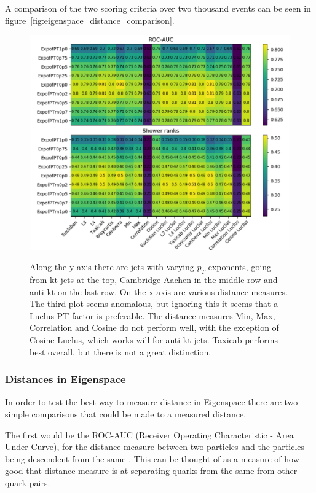 A comparison of the two scoring criteria over two thousand events can be seen in figure~\ref{fig:eigenspace_distance_comparison}.
\begin{figure}[htp]
    \includegraphics[width=1.\textwidth]{graphics/physspace_distance_comparison}
    \label{fig:physspace_distance_comparison}
    \caption{
            Along the y axis there are jets with varying \(p_T\) exponents, going
            from kt jets at the top, Cambridge Aachen in the middle row and anti-kt
            on the last row.
            On the x axis are various distance measures.
            The third plot seems anomalous, but ignoring this
            it seems that a Luclus PT factor is preferable.
            The distance measures Min, Max, Correlation and Cosine
            do not perform well, with the exception of
            Cosine-Luclus, which works will for anti-kt jets.
            Taxicab performs best overall, but there is not
            a great distinction.
             }
\end{figure}    

\FloatBarrier
\subsubsection{Distances in Eigenspace}\label{sec:distance_in_eigenspace}
In order to test the best way to measure distance in Eigenspace there are two simple comparisons
that could be made to a measured distance.

The first would be the ROC-AUC (Receiver Operating Characteristic - Area Under Curve),
for the distance measure between two particles and the particles being descendent from the same
.
This can be thought of as a measure of how good that distance measure is at separating 
quarks from the same  from other quark pairs.

